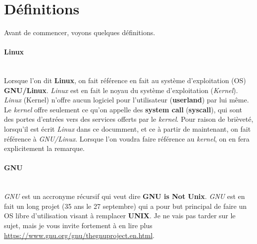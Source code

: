 \documentclass[12pt,oneside,final]{article}
\begin{document}
% 

\let\bf\textbf
\let\it\textit

% 
% 


\newpage
\section{Définitions}
Avant de commencer, voyons quelques définitions.

\paragraph{Linux} ~ \\ Lorsque l'on dit \bf{Linux}, on fait référence en fait
au système d'exploitation (OS) \bf{GNU/Linux}. \it{Linux} est en fait
le noyau du système d'exploitation (\it{Kernel}). \it{Linux} (Kernel)
n'offre aucun logiciel pour l'utilisateur (\bf{userland}) par lui
même. Le \it{kernel} offre seulement ce qu'on appelle des \bf{system
  call} (\bf{syscall}), qui sont des portes d'entrées vers des
services offerts par le \it{kernel}. Pour raison de brièveté,
lorsqu'il est écrit \it{Linux} dans ce documment, et ce à partir de
maintenant, on fait référence à \it{GNU/Linux}. Lorsque l'on voudra
faire référence au \it{kernel}, on en fera explicitement la remarque.

\paragraph{GNU} ~ \\ \it{GNU} est un accronyme récursif qui veut dire \bf{GNU
  is Not Unix}. \it{GNU} est en fait un long projet (35 ans le 27
septembre) qui a pour but principal de faire un OS libre d'utilisation
visant à remplacer \bf{UNIX}. Je ne vais pas tarder sur le sujet, mais
je vous invite fortement à en lire plus \url{https://www.gnu.org/gnu/thegnuproject.en.html}.
\end{document}

